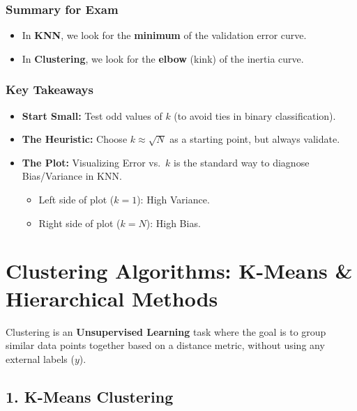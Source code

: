 \documentclass[
  italian,
  11pt,
]{article}
\begin{document}
\subsubsection{Summary for Exam}\label{summary-for-exam}

\begin{itemize}
\item
  In \textbf{KNN}, we look for the \textbf{minimum} of the validation
  error curve.
\item
  In \textbf{Clustering}, we look for the \textbf{elbow} (kink) of the
  inertia curve.
\end{itemize}

\subsubsection{Key Takeaways}\label{key-takeaways-20}

\begin{itemize}
\item
  \textbf{Start Small:} Test odd values of \(k\) (to avoid ties in
  binary classification).
\item
  \textbf{The Heuristic:} Choose \(k \approx \sqrt{N}\) as a starting
  point, but always validate.
\item
  \textbf{The Plot:} Visualizing Error vs.~\(k\) is the standard way to
  diagnose Bias/Variance in KNN.

  \begin{itemize}
  \item
    Left side of plot (\(k=1\)): High Variance.
  \item
    Right side of plot (\(k=N\)): High Bias.

    \newpage
  \end{itemize}
\end{itemize}

\section{Clustering Algorithms: K-Means \& Hierarchical
Methods}\label{clustering-algorithms-k-means-hierarchical-methods}

Clustering is an \textbf{Unsupervised Learning} task where the goal is
to group similar data points together based on a distance metric,
without using any external labels (\(y\)).

\subsection{1. K-Means Clustering}\label{k-means-clustering}
\end{document}
